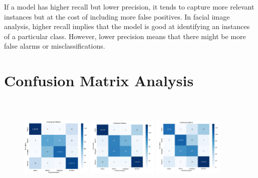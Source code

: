     \vspace*{1em}

    \noindent If a model has higher recall but lower precision, it tends to capture more relevant instances but at the cost of including more false positives. In facial image analysis, higher recall implies that the model is good at identifying an instances of a particular class. However, lower precision means that there might be more false alarms or misclassifications. \cite{apc}


\section{Confusion Matrix Analysis}

\begin{figure}[h!]
    \centering
  
    \includegraphics[width=0.3\textwidth, height=5cm]{resources/cfmt-main.jpeg}
    \includegraphics[width=0.3\textwidth, height=5cm]{resources/cfmt-v1.jpeg}
    \includegraphics[width=0.3\textwidth, height=5cm]{resources/cfmt-v2.jpeg}


\end{figure}
